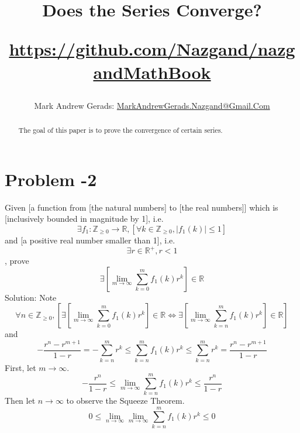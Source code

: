 \documentclass[]{article}
\author{Mark Andrew Gerads: \href{MailTo:MarkAndrewGerads.Nazgand@Gmail.Com}{MarkAndrewGerads.Nazgand@Gmail.Com}}
\title{
	Does the Series Converge?
	
	\href{https://github.com/Nazgand/nazgandMathBook}{https://github.com/Nazgand/nazgandMathBook}
}
\newcommand{\pqty}[1]{{\left(#1\right)}}
\newcommand{\bqty}[1]{{\left[#1\right]}}
\newcommand{\abs}[1]{{\left\lvert#1\right\rvert}}
\numberwithin{equation}{section}
\begin{document}
	
	\maketitle
	
	\begin{abstract}
		The goal of this paper is to prove the convergence of certain series.
	\end{abstract}

	\section{Problem -2}
	Given [a function from [the natural numbers] to [the real numbers]] which is [inclusively bounded in magnitude by 1], i.e.
	\begin{equation}
		\exists f_1:\mathbb{Z}_{\geq 0}\to\mathbb{R},
		\bqty{\forall k\in\mathbb{Z}_{\geq 0}, \abs{f_1\pqty{k}}\leq 1}
	\end{equation}
	and [a positive real number smaller than 1], i.e.
	\begin{equation}
		\exists r\in\mathbb{R}^+,
		r<1
	\end{equation}
	, prove
	\begin{equation}
		\exists \bqty{\lim\limits_{m\to\infty}\sum_{k=0}^m{f_1\pqty{k}}r^k}
		\in\mathbb{R}
	\end{equation}
	Solution: Note
	\begin{equation}
		\forall n\in\mathbb{Z}_{\geq 0},\bqty{
			\exists \bqty{\lim\limits_{m\to\infty}\sum_{k=0}^m{f_1\pqty{k}}r^k}
			\in\mathbb{R}
			\Leftrightarrow
			\exists \bqty{\lim\limits_{m\to\infty}\sum_{k=n}^m{f_1\pqty{k}}r^k}
			\in\mathbb{R}
		}
	\end{equation}
	and
	\begin{equation}
		-\frac{r^n-r^{m+1}}{1-r}=-\sum_{k=n}^m r^k\leq\sum_{k=n}^m{f_1\pqty{k}}r^k\leq\sum_{k=n}^m r^k=\frac{r^n-r^{m+1}}{1-r}
	\end{equation}
	First, let $m\to\infty$.
	\begin{equation}
		-\frac{r^n}{1-r}\leq\lim\limits_{m\to\infty}\sum_{k=n}^m{f_1\pqty{k}}r^k\leq\frac{r^n}{1-r}
	\end{equation}
	Then let $n\to\infty$ to observe the Squeeze Theorem.
	\begin{equation}
		0\leq\lim\limits_{n\to\infty}\lim\limits_{m\to\infty}\sum_{k=n}^m{f_1\pqty{k}}r^k\leq 0
	\end{equation}
\end{document}
